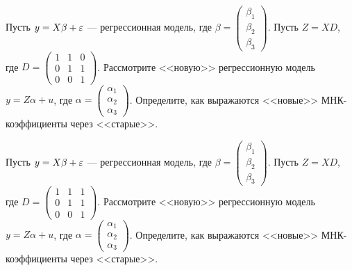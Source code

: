 \documentclass[pdftex,11pt,openany]{book}\usepackage[]{graphicx}\usepackage[]{color}
\begin{document}
\begin{solution}
\end{solution}


\begin{problem} 
Пусть $y = X\beta + \varepsilon$ --- регрессионная модель, где $\beta = \begin{pmatrix} \beta_1 \\ \beta_2 \\ \beta_3 \end{pmatrix}$. Пусть $Z = XD$, где $D = \begin{pmatrix} 1 & 1 & 0 \\ 0 & 1 & 1 \\ 0 & 0 & 1 \end{pmatrix}$. Рассмотрите <<новую>> регрессионную модель $y = Z\alpha + u$, где $\alpha = \begin{pmatrix} \alpha_1 \\ \alpha_2 \\ \alpha_3 \end{pmatrix}$. Определите, как выражаются <<новые>> МНК-коэффициенты через <<старые>>.


\end{problem}

\begin{solution}
\end{solution}


\begin{problem}
Пусть $y = X\beta + \varepsilon$ --- регрессионная модель, где $\beta = \begin{pmatrix} \beta_1 \\ \beta_2 \\ \beta_3 \end{pmatrix}$. Пусть $Z = XD$, где $D = \begin{pmatrix} 1 & 1 & 1 \\ 0 & 1 & 1 \\ 0 & 0 & 1 \end{pmatrix}$. Рассмотрите <<новую>> регрессионную модель $y = Z\alpha + u$, где $\alpha = \begin{pmatrix} \alpha_1 \\ \alpha_2 \\ \alpha_3 \end{pmatrix}$. Определите, как выражаются <<новые>> МНК-коэффициенты через <<старые>>.


\end{problem}

\begin{solution}
\end{solution}
\end{document}
